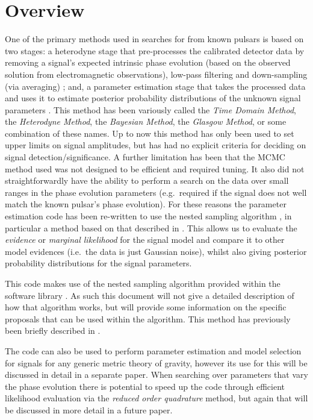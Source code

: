 \section{Overview}

One of the primary methods used in searches for \gws from known pulsars is based on two stages: a heterodyne
stage that pre-processes the calibrated \gw detector data by removing a signal's expected intrinsic phase
evolution (based on the observed solution from electromagnetic observations), low-pass filtering and
down-sampling (via averaging) \citep{2005PhRvD..72j2002D}; and, a parameter estimation stage that takes the
processed data and uses it to estimate posterior probability distributions of the unknown signal parameters
\citep[e.g.\ using a Markov chain Monte Carlo (MCMC)][]{2010ApJ...713..671A}. This method has been variously
called the {\it Time Domain Method}, the {\it Heterodyne Method}, the {\it Bayesian Method}, the {\it Glasgow
Method}, or some combination of these names. Up to now this method has only been used to set upper limits
on signal amplitudes, but has had no explicit criteria for deciding on signal detection/significance. A further
limitation has been that the MCMC method used was not designed to be efficient and required tuning. It also
did not straightforwardly have the ability to perform a search on the data over small ranges in the phase
evolution parameters (e.g.\ required if the
\gw signal does not well match the known pulsar's phase evolution). For these reasons the parameter
estimation code has been re-written to use the nested sampling algorithm \cite{Skilling:2006}, in particular
a method based on that described in \citet{Veitch:2010}. This allows us to evaluate the {\it evidence} or {\it
marginal likelihood} for the signal model and compare it to other model evidences (i.e.\ the data is just
Gaussian noise), whilst also giving posterior probability distributions for the signal parameters.

This code makes use of the nested sampling algorithm provided within the \lalinf software library
\citep{2015PhRvD..91d2003V}. As such this document will not give a detailed description of how that algorithm
works, but will provide some information on the specific proposals that can be used within the algorithm.
This method has previously been briefly described in \citet{2012JPhCS.363a2041P}.

The code can also be used to perform parameter estimation and model selection for signals for any generic
metric theory of gravity, however its use for this will be discussed in detail in a separate paper. When
searching over parameters that vary the phase evolution there is potential to speed up the code through
efficient likelihood evaluation via the {\it reduced order quadrature} method, but again that will be
discussed in more detail in a future paper.

